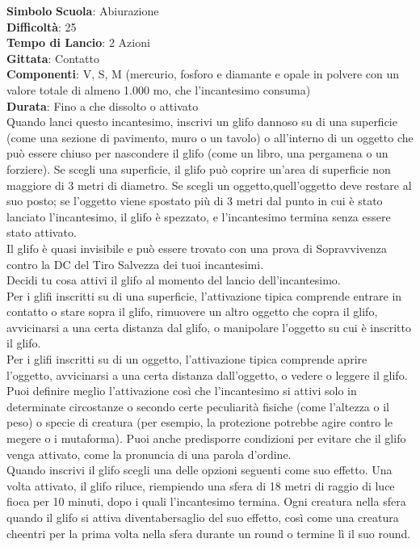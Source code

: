 \begin{multicols}{2}
\medskip\textbf{Simbolo}
\textbf{Scuola}: Abiurazione\\
\textbf{Difficoltà}: 25\\
\textbf{Tempo di Lancio}: 2 Azioni\\
\textbf{Gittata}: Contatto\\
\textbf{Componenti}: V, S, M (mercurio, fosforo e diamante e opale in polvere con un valore totale di almeno 1.000 mo, che l'incantesimo consuma)\\
\textbf{Durata}: Fino a che dissolto o attivato\\
Quando lanci questo incantesimo, inscrivi un glifo dannoso su di una superficie (come una sezione di pavimento, muro o un tavolo) o all'interno di un oggetto che può essere chiuso per nascondere il glifo (come un libro, una pergamena o un forziere). Se scegli una superficie, il glifo può coprire un'area di superficie non maggiore di 3 metri di diametro. Se scegli un oggetto,quell'oggetto deve restare al suo posto; se l'oggetto viene spostato più di 3 metri dal punto in cui è stato lanciato l'incantesimo, il glifo è spezzato, e l'incantesimo termina senza essere stato attivato.\\
Il glifo è quasi invisibile e può essere trovato con una prova di Sopravvivenza contro la DC del Tiro Salvezza dei tuoi incantesimi.\\
Decidi tu cosa attivi il glifo al momento del lancio dell'incantesimo.\\
Per i glifi inscritti su di una superficie, l'attivazione tipica comprende entrare in contatto o stare sopra il glifo, rimuovere un altro oggetto che copra il glifo, avvicinarsi a una certa distanza dal glifo, o manipolare l'oggetto su cui è inscritto il glifo.\\
Per i glifi inscritti su di un oggetto, l'attivazione tipica comprende aprire l'oggetto, avvicinarsi a una certa distanza dall'oggetto, o vedere o leggere il glifo.\\
Puoi definire meglio l'attivazione così che l'incantesimo si attivi solo in determinate circostanze o secondo certe peculiarità fisiche (come l'altezza o il peso) o specie di creatura (per esempio, la protezione potrebbe agire contro le megere o i mutaforma). Puoi anche predisporre condizioni per evitare che il glifo venga attivato, come la pronuncia di una parola d'ordine.\\
Quando inscrivi il glifo scegli una delle opzioni seguenti come suo effetto. Una volta attivato, il glifo riluce, riempiendo una sfera di 18 metri di raggio di luce fioca per 10 minuti, dopo i quali l'incantesimo termina. Ogni creatura nella sfera quando il glifo si attiva diventabersaglio del suo effetto, così come una creatura cheentri per la prima volta nella sfera durante un round o termine lì il suo round.\\

\end{multicols}
